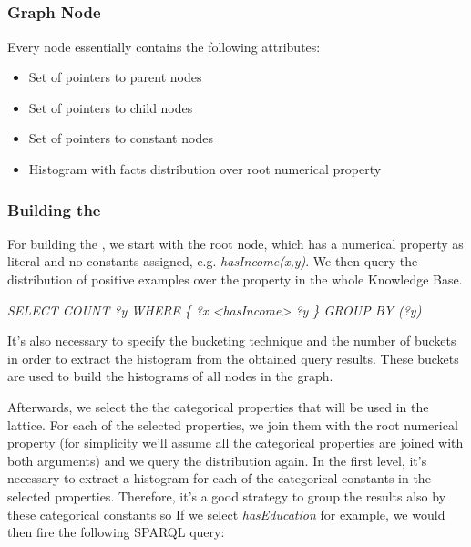 \subsection{\graphname}

\subsubsection{Graph Node}

Every node essentially contains the following attributes:

\begin{itemize}
 \item Set of pointers to parent nodes
 \item Set of pointers to child nodes
 \item Set of pointers to constant nodes
 \item Histogram with facts distribution over root numerical property
\end{itemize}


\subsubsection{Building the \graphname}

For building the \graphname, we start with the root node, which has a numerical property as literal and no constants assigned, e.g. \emph{hasIncome(x,y)}. We then query the  distribution of positive examples over the property in the whole Knowledge Base.

\begin{center}
 \emph{SELECT COUNT ?y WHERE \{ ?x <hasIncome> ?y \} GROUP BY (?y)}
\end{center}

It's also necessary to specify the bucketing technique and the number of buckets in order to extract the histogram from the obtained query results. These buckets are used to build the histograms of all nodes in the graph.

Afterwards, we select the the categorical properties that will be used in the lattice. For each of the selected properties, we join them with the root numerical property (for simplicity we'll assume all the categorical properties are joined with both  arguments) and we query the distribution again. In the first level, it's necessary to extract a histogram for each of the categorical constants in the selected properties. Therefore, it's a good strategy to group the results also by these categorical constants so If we select \emph{hasEducation} for example, we would then fire the following SPARQL query:

